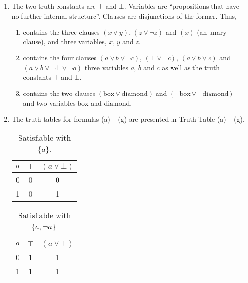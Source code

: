 \documentclass{article}
\begin{document}
\begin{enumerate}
    \item The two truth constants are $\top$ and $\bot$. Variables are \enquote{propositions that have no further internal structure}. Clauses are disjunctions of the former. Thus,
    
    \begin{enumerate}[label=(\alph*)]
        \item contains the three clauses $(x \lor y)$, $(z \lor \neg z)$ and $(x)$ (an unary clause), and three variables, $x$, $y$ and $z$.
        
        \item contains the four clauses $(a \lor b \lor \neg c)$, $(\top \lor \neg c)$, $(a \lor b \lor c)$ and $(a \lor b \lor \neg \bot \lor \neg a)$ three variables $a$, $b$ and $c$ as well as the truth constants $\top$ and $\bot$.
        
        \item contains the two clauses $(\text{box} \lor \text{diamond})$ and $(\neg \text{box} \lor \neg \text{diamond})$ and two variables $\text{box}$ and $\text{diamond}$.
    \end{enumerate}

    \item The truth tables for formulas (a) -- (g) are presented in Truth Table (a) -- (g).
    
    \begin{table}[h]
        \centering
        \begin{tabular}{c c | c}\toprule
            $a$ & $\bot$ & $(a \lor \bot)$ \\\midrule
            0 & 0 & 0 \\
            1 & 0 & 1 \\\bottomrule
        \end{tabular}
        \caption{Satisfiable with $\{a\}$.}
    \end{table}

    \begin{table}[h]
        \centering
        \begin{tabular}{c c | c}\toprule
            $a$ & $\top$ & $(a \lor \top)$ \\\midrule
            0 & 1 & 1 \\
            1 & 1 & 1 \\\bottomrule
        \end{tabular}
        \caption{Satisfiable with $\{a, \neg a\}$.}
    \end{table}


\end{enumerate}
\end{document}
